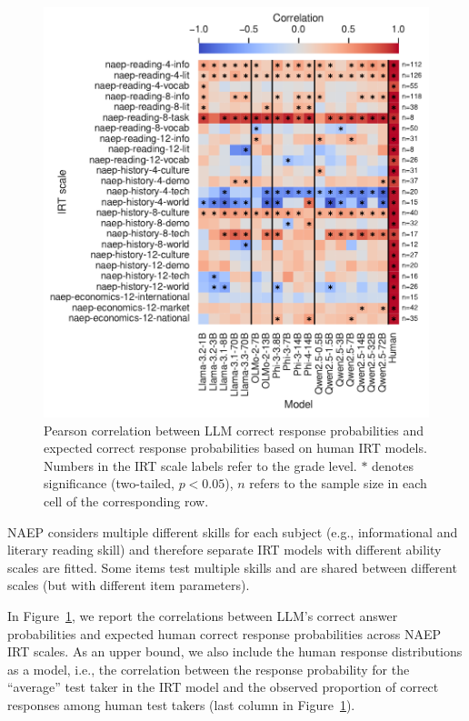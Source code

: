 \documentclass[11pt]{article}
\begin{document}
\begin{figure}
  \centering
  \includegraphics[width=\columnwidth]{figures/irt-correlation.pdf}
  \caption{Pearson correlation between LLM correct response probabilities and expected correct response probabilities based on human IRT models. Numbers in the IRT scale labels refer to the grade level. $*$ denotes significance (two-tailed, $p < 0.05$), $n$ refers to the sample size in each cell of the corresponding row.}
  \label{fig:irt-correlation}
\end{figure}

NAEP considers multiple different skills for each subject (e.g., informational and literary reading skill) and therefore separate IRT models with different ability scales are fitted. Some items test multiple skills and are shared between different scales (but with different item parameters).

In Figure~\ref{fig:irt-correlation}, we report the correlations between LLM's correct answer probabilities and expected human correct response probabilities across NAEP IRT scales. As an upper bound, we also include the human response distributions as a model, i.e., the correlation between the response probability for the ``average'' test taker in the IRT model and the observed proportion of correct responses among human test takers (last column in Figure~\ref{fig:irt-correlation}).
\end{document}
